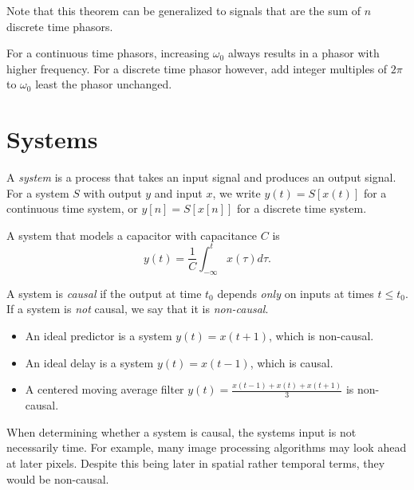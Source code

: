 \begin{rmk}
    Note that this theorem can be generalized to signals that are the sum of $n$ discrete time phasors.
\end{rmk}

\begin{rmk}
    For a continuous time phasors, increasing $\omega_0$ always results in a phasor with higher frequency. For a discrete time phasor however, add integer multiples of $2\pi$ to $\omega_0$ least the phasor unchanged.
\end{rmk}

\section{Systems}

A \emph{system} is a process that takes an input signal and produces an output signal. For a system $S$ with output $y$ and input $x$, we write $y(t) = S[x(t)]$ for a continuous time system, or $y[n] = S[x[n]]$ for a discrete time system.

\begin{exmp}
    A system that models a capacitor with capacitance $C$ is \[y(t) = \frac{1}{C}\int_{-\infty}^{t}x(\tau)d\tau.\]
\end{exmp}

\begin{defn}
    A system is \emph{causal} if the output at time $t_0$ depends \emph{only} on inputs at times $t \leq t_0$. If a system is \emph{not} causal, we say that it is \emph{non-causal}.
\end{defn}

\begin{exmp}\proofbreak
    \begin{itemize}
        \item An ideal predictor is a system $y(t) = x(t+1)$, which is non-causal.
        \item An ideal delay is a system $y(t) = x(t-1)$, which is causal.
        \item A centered moving average filter $y(t) = \frac{x(t-1) + x(t) + x(t+1)}{3}$ is non-causal.
    \end{itemize}
\end{exmp}

\begin{rmk}
    When determining whether a system is causal, the systems input is not necessarily time. For example, many image processing algorithms may look ahead at later pixels. Despite this being later in spatial rather temporal terms, they would be non-causal.
\end{rmk}


